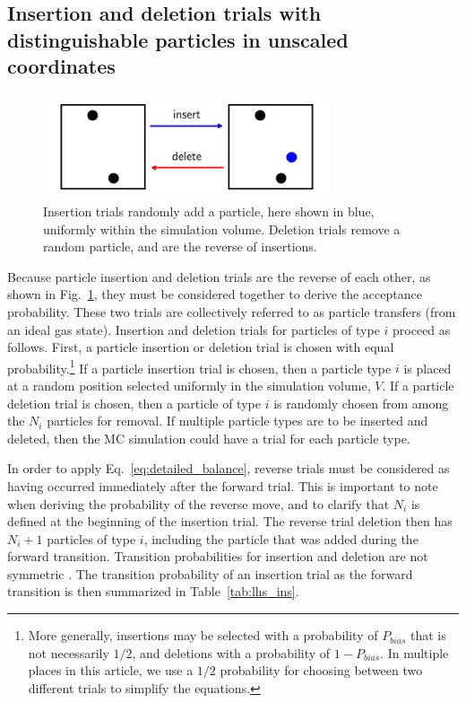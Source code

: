 \documentclass[
  9pt,
  bestpractices,
  pubversion,
]{livecoms}
\begin{document}
\subsection{\label{sec:lhs_insdel}Insertion and deletion trials with distinguishable particles in unscaled coordinates}

\begin{figure}
\begin{centering}
\includegraphics[width=8.5cm]{../figures/muvt.pdf}
\caption{
Insertion trials randomly add a particle, here shown in blue, uniformly within the simulation volume.
Deletion trials remove a random particle, and are the reverse of insertions.
}
\label{fig:muvt}
\end{centering}
\end{figure}

Because particle insertion and deletion trials \cite{norman_investigation_1969, adams_grand_1975} are the reverse of each other, as shown in Fig.~\ref{fig:muvt}, they must be considered together to derive the acceptance probability.
These two trials are collectively referred to as particle transfers (from an ideal gas state).
Insertion and deletion trials for particles of type $i$ proceed as follows.
First, a particle insertion or deletion trial is chosen with equal probability.\footnote{More generally, insertions may be selected with a probability of $P_{bias}$ that is not necessarily $1/2$, and deletions with a probability of $1-P_{bias}$.
In multiple places in this article, we use a $1/2$ probability for choosing between two different trials to simplify the equations.}
If a particle insertion trial is chosen, then a particle type $i$ is placed at a random position selected uniformly in the simulation volume, $V$.
If a particle deletion trial is chosen, then a particle of type $i$ is randomly chosen from among the $N_i$ particles for removal.
If multiple particle types are to be inserted and deleted, then the MC simulation could have a trial for each particle type.

In order to apply Eq.~\ref{eq:detailed_balance}, reverse trials must be considered as having occurred immediately after the forward trial.
This is important to note when deriving the probability of the reverse move, and to clarify that $N_i$ is defined at the beginning of the insertion trial.
The reverse trial deletion then has $N_i+1$ particles of type $i$, including the particle that was added during the forward transition.
Transition probabilities for insertion and deletion are not symmetric \cite{norman_investigation_1969, hastings_monte_1970}.
The transition probability of an insertion trial as the forward transition is then summarized in Table~\ref{tab:lhs_ins}.
\end{document}
